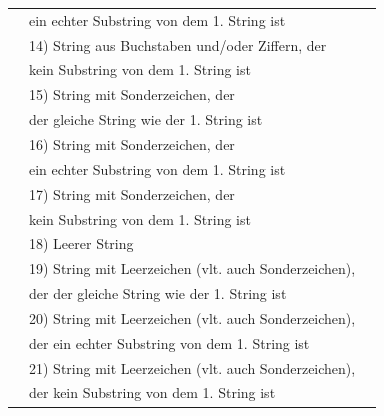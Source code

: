 \documentclass[a4paper]{report}
\begin{document}
\begin{tabular}{l|l|l}
    			&    ein echter Substring von dem 1. String ist 		& \\
    			& 14) String aus Buchstaben und/oder Ziffern, der		& \\
    			&    kein Substring von dem 1. String ist				& \\
    			& 15) String mit Sonderzeichen, der					& \\
    			&    der gleiche String wie der 1. String ist 			& \\
    			& 16) String mit Sonderzeichen, der	 				& \\
    			&    ein echter Substring von dem 1. String ist 		& \\
    			& 17) String mit Sonderzeichen, der	 				& \\
    			&    kein Substring von dem 1. String ist				& \\
    			& 18) Leerer String										& \\
    			& 19) String mit Leerzeichen (vlt. auch Sonderzeichen),& \\
    			&    der der gleiche String wie der 1. String ist 		& \\
    			& 20) String mit Leerzeichen (vlt. auch Sonderzeichen),& \\
    			&    der ein echter Substring von dem 1. String ist 	& \\
    			& 21) String mit Leerzeichen (vlt. auch Sonderzeichen),& \\
    			&    der kein Substring von dem 1. String ist			& \\
\end{tabular} \\ \\
\end{document}
